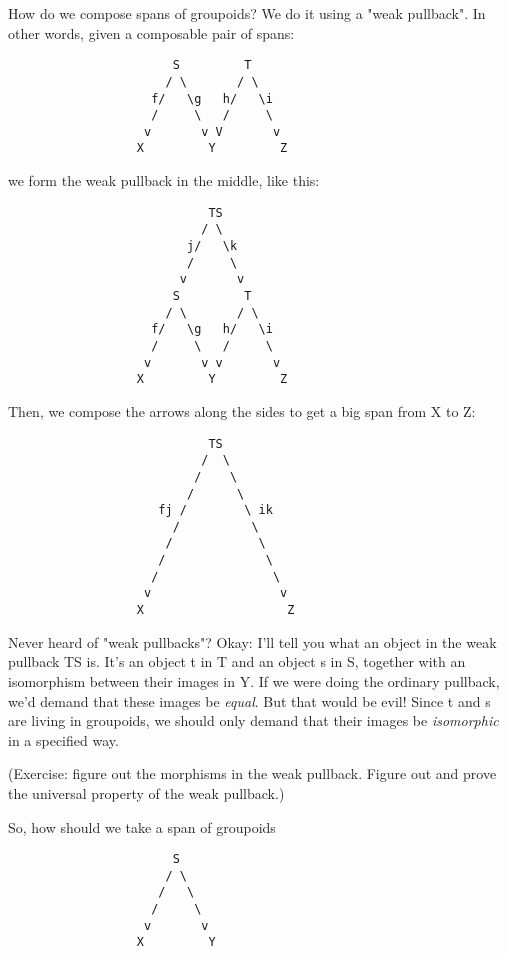 How do we compose spans of groupoids?  We do it using a "weak 
pullback".  In other words, given a composable pair of spans:

\begin{verbatim}
                       S         T
                      / \       / \
                    f/   \g   h/   \i
                    /     \   /     \
                   v       v V       v
                  X         Y         Z
\end{verbatim}
    
we form the weak pullback in the middle, like this:

\begin{verbatim}
                            TS
                           / \
                         j/   \k
                         /     \
                        v       v
                       S         T
                      / \       / \
                    f/   \g   h/   \i
                    /     \   /     \
                   v       v v       v
                  X         Y         Z
\end{verbatim}
    
Then, we compose the arrows along the sides to get a big span 
from X to Z:

\begin{verbatim}
                            TS
                           /  \
                          /    \
                         /      \
                     fj /        \ ik
                       /          \
                      /            \
                     /              \
                    /                \
                   v                  v
                  X                    Z
\end{verbatim}
    
Never heard of "weak pullbacks"?  Okay: I'll tell you what an 
object in the weak pullback TS is.  It's an object t in T and an 
object s in S, together with an isomorphism between their images in Y.  
If we were doing the ordinary pullback, we'd demand that these
images be \emph{equal}.  But that would be evil!  Since t and s are living 
in groupoids, we should only demand that their images be \emph{isomorphic} 
in a specified way.  

(Exercise: figure out the morphisms in the weak pullback.  Figure 
out and prove the universal property of the weak pullback.)

So, how should we take a span of groupoids 

\begin{verbatim}
                       S
                      / \
                     /   \
                    /     \
                   v       v
                  X         Y
\end{verbatim}
    
